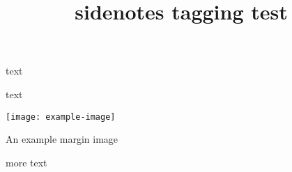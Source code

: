\documentclass{article}
\title{sidenotes tagging test}
\begin{document}
text %



text
\begin{marginfigure} %
\centering
\texttt{[image: example-image]}
\caption{An example margin image}
\end{marginfigure}
more text
\end{document}
